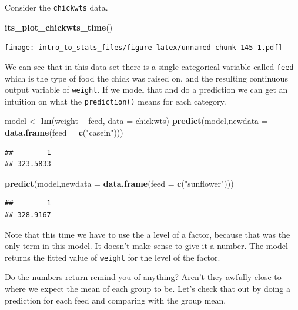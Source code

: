 \documentclass[
]{book}
\newenvironment{Shaded}{\begin{snugshade}}{\end{snugshade}}
\newcommand{\DataTypeTok}[1]{\textcolor[rgb]{0.13,0.29,0.53}{#1}}
\newcommand{\KeywordTok}[1]{\textcolor[rgb]{0.13,0.29,0.53}{\textbf{#1}}}
\newcommand{\NormalTok}[1]{#1}
\newcommand{\OperatorTok}[1]{\textcolor[rgb]{0.81,0.36,0.00}{\textbf{#1}}}
\newcommand{\StringTok}[1]{\textcolor[rgb]{0.31,0.60,0.02}{#1}}
\begin{document}
Consider the \texttt{chickwts} data.

\begin{Shaded}
\begin{Highlighting}[]
\KeywordTok{its_plot_chickwts_time}\NormalTok{()}
\end{Highlighting}
\end{Shaded}

\texttt{[image: intro\_to\_stats\_files/figure-latex/unnamed-chunk-145-1.pdf]}

We can see that in this data set there is a single categorical variable called \texttt{feed} which is the type of food the chick was raised on, and the resulting continuous output variable of \texttt{weight}. If we model that and do a prediction we can get an intuition on what the \texttt{prediction()} means for each category.

\begin{Shaded}
\begin{Highlighting}[]
\NormalTok{model <-}\StringTok{ }\KeywordTok{lm}\NormalTok{(weight }\OperatorTok{~}\StringTok{ }\NormalTok{feed, }\DataTypeTok{data =}\NormalTok{ chickwts)}
\KeywordTok{predict}\NormalTok{(model,}\DataTypeTok{newdata =} \KeywordTok{data.frame}\NormalTok{(}\DataTypeTok{feed =} \KeywordTok{c}\NormalTok{(}\StringTok{"casein"}\NormalTok{)))}
\end{Highlighting}
\end{Shaded}

\begin{verbatim}
##        1 
## 323.5833
\end{verbatim}

\begin{Shaded}
\begin{Highlighting}[]
\KeywordTok{predict}\NormalTok{(model,}\DataTypeTok{newdata =} \KeywordTok{data.frame}\NormalTok{(}\DataTypeTok{feed =} \KeywordTok{c}\NormalTok{(}\StringTok{"sunflower"}\NormalTok{)))}
\end{Highlighting}
\end{Shaded}

\begin{verbatim}
##        1 
## 328.9167
\end{verbatim}

Note that this time we have to use the a level of a factor, because that was the only term in this model. It doesn't make sense to give it a number. The model returns the fitted value of \texttt{weight} for the level of the factor.

Do the numbers return remind you of anything? Aren't they awfully close to where we expect the mean of each group to be. Let's check that out by doing a prediction for each feed and comparing with the group mean.
\end{document}
